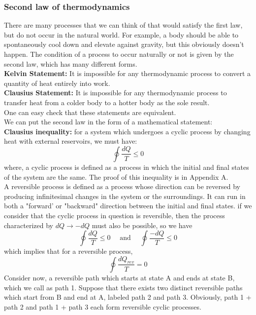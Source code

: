 \documentclass[letterpaper,10pt,english]{article}
\begin{document}
\subsubsection{Second law of thermodynamics}
There are many processes that we can think of that would satisfy the first law, but do not occur in the natural world. For example, a body should be able to spontaneously cool down and elevate against gravity, but this obviously doesn't happen. The condition of a process to occur naturally or not is given by the second law, which has many different forms. \\
\textbf{Kelvin Statement:} It is impossible for any thermodynamic process to convert a quantity of heat entirely into work. \\
\textbf{Clausius Statement:} It is impossible for any thermodynamic process to transfer heat from a colder body to a hotter body as the sole result. \\
One can easy check that these statements are equivalent. \\
We can put the second law in the form of a mathematical statement:\\
\textbf{Clausius inequality:} for a system which undergoes a cyclic process by changing heat with external reservoirs, we must have:
\begin{equation}
\oint \frac{dQ}{T} \leq 0
\end{equation}
where, a cyclic process is defined as a process in which the initial and final states of the system are the same. The proof of this inequality is in Appendix A. \\
A reversible process is defined as a process whose direction can be reversed by producing infinitesimal changes in the system or the surroundings. It can run in both a "forward' or "backward" direction between the initial and final states. if we consider that the cyclic process in question is reversible, then the process characterized by $dQ \rightarrow -dQ$ must also be possible, so we have 
\begin{equation*}
\oint \frac{dQ}{T} \leq 0 \quad \text{ and } \quad \oint \frac{-dQ}{T} \leq 0
\end{equation*}
which implies that for a reversible process, 
\begin{equation}
\oint \frac{dQ_{rev}}{T} = 0
\end{equation}
Consider now, a reversible path which starts at state A and ends at state B, which we call as path 1. Suppose that there exists two distinct reversible paths which start from B and end at A, labeled path 2 and path 3. Obviously, path 1 + path 2 and path 1 + path 3 each form reversible cyclic processes. \\
\end{document}
